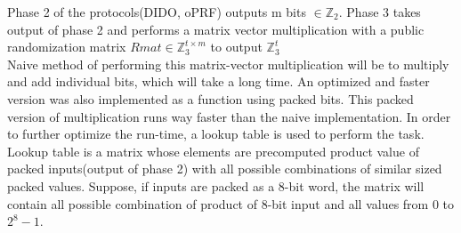 Phase 2 of the protocols(DIDO, oPRF) outputs m bits $\in \mathbb{Z}_2$. Phase 3 takes output of phase 2 and performs a matrix vector multiplication with a public randomization matrix $Rmat \in \mathbb{Z}_{3}^{t \times m} $ to output $\mathbb{Z}_{3}^{t} $\\
Naive method of performing this matrix-vector multiplication will be to multiply and add individual bits, which will take a long time. An optimized and faster version was also implemented as a function using packed bits. This packed version of multiplication runs way faster than the naive implementation. In order to further optimize the run-time, a lookup table is used to perform the task.\\

Lookup table is a matrix whose elements are precomputed product value of packed inputs(output of phase 2) with all possible combinations of similar sized packed values. Suppose, if inputs are packed as a 8-bit word, the matrix will contain all possible combination of product of 8-bit input and all values from 0 to $2^{8}-1$. \\

